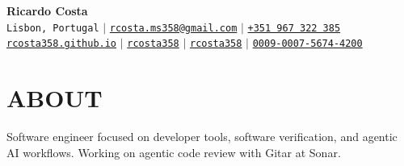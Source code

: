 \documentclass[letterpaper,11pt]{article}
\let\oldhref\href
\newcommand{\plainhref}[2]{\oldhref{#1}{#2}}
\renewcommand{\href}[2]{\oldhref{#1}{#2\,{\color{dark-grey}\scriptsize\faLink}}}
\begin{document}
\begin{center}
    \textbf{\Huge Ricardo Costa} \\ \vspace{5pt}
    \small \faMapMarker* \hspace{2pt}\texttt{Lisbon, Portugal} \hspace{1pt} $|$
    \hspace{1pt} \faEnvelope \hspace{2pt} \plainhref{mailto:rcosta.ms358@gmail.com}{\texttt{rcosta.ms358@gmail.com}} \hspace{1pt} $|$
    \hspace{1pt} \faPhone \hspace{2pt} \plainhref{tel:+351967322385}{\texttt{+351 967 322 385}} \\
    \small \faGlobe \hspace{2pt} \plainhref{https://rcosta358.github.io/}{\texttt{rcosta358.github.io}} \hspace{1pt} $|$
    \hspace{1pt} \faLinkedin \hspace{2pt} \plainhref{https://www.linkedin.com/in/rcosta358/}{\texttt{rcosta358}} \hspace{1pt} $|$
    \hspace{1pt} \faGithub \hspace{2pt} \plainhref{https://github.com/rcosta358}{\texttt{rcosta358}} \hspace{1pt} $|$
    \hspace{1pt} \faIdBadge \hspace{2pt} \plainhref{https://orcid.org/0009-0007-5674-4200}{\texttt{0009-0007-5674-4200}}
    \\ \vspace{-3pt}
\end{center}

\section{ABOUT}
 \begin{itemize}[leftmargin=0in, label={}]
    \small{\item{
      Software engineer focused on developer tools, software verification, and agentic AI workflows. Working on agentic code review with Gitar at Sonar.
    }}
 \end{itemize}
\end{document}
